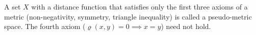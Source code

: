 A set $X$ with a distance function that satisfies only the first three axioms of a metric (non-negativity, symmetry, triangle inequality) is called a pseudo-metric space. The fourth axiom ($\varrho(x,y) = 0 \implies x = y$) need not hold.
